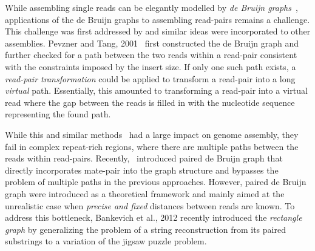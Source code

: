 \documentclass[a4paper]{article}
\begin{document}
While assembling single reads can be elegantly modelled by 
{\em de Bruijn graphs}~\cite{Idury95 ,Pevzner01}, applications of 
the de Bruijn graphs to assembling read-pairs remains a challenge. 
This  challenge  was first addressed by \cite{Pevzner01b} and similar ideas were incorporated to other assemblies.  Pevzner and Tang, 2001~\cite{Pevzner01b} first constructed the de Bruijn
graph and further checked for a path between the two reads within a read-pair consistent with the constraints imposed by the
insert size. If only one such path exists, a {\em read-pair transformation}
could be applied to  transform a read-pair into a long {\em virtual} path.  Essentially, this amounted
to transforming a read-pair into  a virtual  read where the gap between the
reads is filled in with the nucleotide sequence representing the found path. %

While this and similar methods~\cite{Zerbino09, Butler08, Boisvert10, SOAP,Simpson09,Peng10} 
had a large impact on genome assembly,  they fail in complex repeat-rich
regions, where there are multiple paths between the reads within read-pairs. Recently,~\cite{Medvedev11} introduced
paired de Bruijn graph that directly incorporates mate-pair into the graph structure and bypasses the problem of multiple
paths in the previous approaches. However, paired de Bruijn graph were introduced as a theoretical framework and mainly aimed 
at the unrealistic case when {\em precise and fixed} distances between reads are known. 
 To address this bottleneck,  Bankevich et al., 2012 recently  introduced the  {\em rectangle graph} by  generalizing the problem of a string 
reconstruction from its paired substrings to a variation of the jigsaw puzzle problem. 

\end{document}
